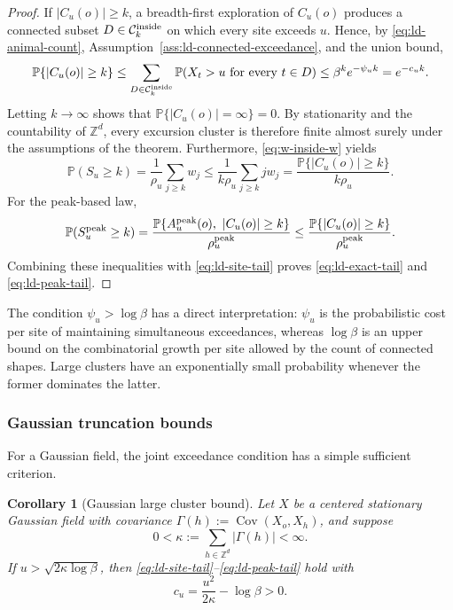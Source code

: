 \documentclass[aap,preprint]{imsart}
\theoremstyle{plain}
\newtheorem{corollary}[theorem]{Corollary}
\theoremstyle{definition}
\def\P{{\mathbb P}}
\def\Z{{\mathbb Z}}
\begin{document}
\begin{proof}
	If $|C_u(o)|\geq k$, a breadth-first exploration of $C_u(o)$ produces a
	connected subset $D\in\mathcal C_k^{\rm inside}$ on which every site
	exceeds $u$.  Hence, by \eqref{eq:ld-animal-count},
	Assumption~\ref{ass:ld-connected-exceedance}, and the union bound,
	\[
	\P\{|C_u(o)|\geq k\}
	\leq
	\sum_{D\in\mathcal C_k^{\rm inside}}
	\P(X_t>u\text{ for every }t\in D)
	\leq \beta^k e^{-\psi_u k}
	=e^{-c_u k}.
	\]
	Letting $k\to\infty$ shows that
	$\P\{|C_u(o)|=\infty\}=0$.  By stationarity and the countability of
	$\Z^d$, every excursion cluster is therefore finite almost surely under
	the assumptions of the theorem.
	Furthermore, \eqref{eq:w-inside-w} yields
	\[
	\P(S_u\geq k)
	=\frac1{\rho_u}\sum_{j\geq k}w_j
	\leq\frac1{k\rho_u}\sum_{j\geq k}jw_j
	=\frac{\P\{|C_u(o)|\geq k\}}{k\rho_u}.
	\]
	For the peak-based law,
	\[
	\P(S_u^{\rm peak}\geq k)
	=
	\frac{\P\{A_u^{\rm peak}(o),\ |C_u(o)|\geq k\}}
	{\rho_u^{\rm peak}}
	\leq
	\frac{\P\{|C_u(o)|\geq k\}}{\rho_u^{\rm peak}}.
	\]
	Combining these inequalities with \eqref{eq:ld-site-tail} proves
	\eqref{eq:ld-exact-tail} and \eqref{eq:ld-peak-tail}.
\end{proof}

The condition $\psi_u>\log \beta$ has a direct interpretation:
$\psi_u$ is the probabilistic cost per site of maintaining simultaneous
exceedances, whereas $\log \beta$ is an upper bound on the combinatorial growth
per site allowed by the count of connected shapes.  Large clusters have an
exponentially small probability whenever the former dominates the latter.

\subsubsection{Gaussian truncation bounds}
\label{sec:ld-gaussian}

For a Gaussian field, the joint exceedance condition has a
simple sufficient criterion.

\begin{corollary}[Gaussian large cluster bound]
	\label{cor:ld-gaussian}
	Let $X$ be a centered stationary Gaussian field with covariance
	$\Gamma(h):=\operatorname{Cov}(X_o,X_h)$, and suppose
	\begin{equation*}
		0<\kappa:=\sum_{h\in\Z^d}|\Gamma(h)|<\infty.
	\end{equation*}
	If $u>\sqrt{2\kappa\log \beta}$,
	then \eqref{eq:ld-site-tail}--\eqref{eq:ld-peak-tail} hold with
	\begin{equation*}
		c_u=\frac{u^2}{2\kappa}-\log \beta>0.
	\end{equation*}
\end{corollary}
\end{document}
